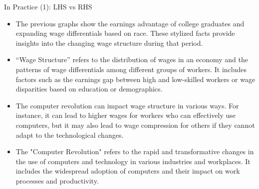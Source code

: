 \documentclass[notes,10pt, aspectratio=169]{beamer}
\begin{document}
\begin{frame}{In Practice (1): LHS vs RHS}
\begin{itemize}
  \item The previous graphs show the earnings advantage of college graduates and expanding wage differentials based on race. These stylized facts provide insights into the changing wage structure during that period.\\[1em]
  \item ``Wage Structure'' refers to the distribution of wages in an economy and the patterns of wage differentials among different groups of workers. It includes factors such as the earnings gap between high and low-skilled workers or wage disparities based on education or demographics.\\[1em]
  \item The computer revolution can impact wage structure in various ways. For instance, it can lead to higher wages for workers who can effectively use computers, but it may also lead to wage compression for others if they cannot adapt to the technological changes.\\[1em]
  \item The "Computer Revolution" refers to the rapid and transformative changes in the use of computers and technology in various industries and workplaces. It includes the widespread adoption of computers and their impact on work processes and productivity.
\end{itemize}
\end{frame}
\end{document}
